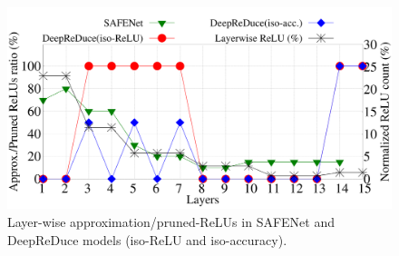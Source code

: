\begin{figure}[t] \centering
\includegraphics[scale=0.15]{Figures/Safenet_layerwise_comp}
\vspace{-1em}
\caption{Layer-wise approximation/pruned-ReLUs in SAFENet and DeepReDuce models (iso-ReLU and iso-accuracy).  
}
\vspace{-1em}
\label{fig:SafenetLayerwiseComp}
\end{figure}
